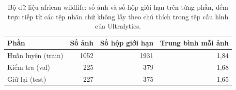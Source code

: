 \begin{table}[H]
\centering
\caption{Bộ dữ liệu african-wildlife: số ảnh và số hộp giới hạn trên từng phần, đếm trực tiếp từ các tệp nhãn chứ không lấy theo chú thích trong tệp cấu hình của Ultralytics.}
\label{tab:dataset}
\small
\begin{tabular}{l r r r}
\toprule
Phần & Số ảnh & Số hộp giới hạn & Trung bình mỗi ảnh \\
\midrule
Huấn luyện (train) & 1052 & 1931 & 1{,}84 \\
Kiểm tra (val) & 225 & 379 & 1{,}68 \\
Giữ lại (test) & 227 & 375 & 1{,}65 \\
\bottomrule
\end{tabular}
\end{table}
